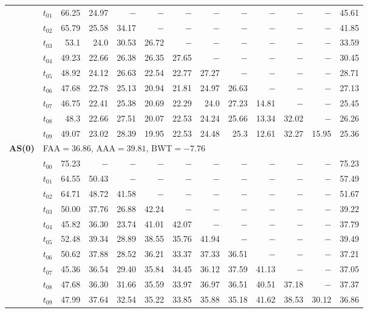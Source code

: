 \begin{table}[ht]
\begin{tabular}{@{}l l r r r r r r r r r r r@{}}
 & $t_{01}$ & 66.25 & 24.97 & $-$ & $-$ & $-$ & $-$ & $-$ & $-$ & $-$ & $-$ & 45.61 \\
 & $t_{02}$ & 65.79 & 25.58 & 34.17 & $-$ & $-$ & $-$ & $-$ & $-$ & $-$ & $-$ & 41.85 \\
 & $t_{03}$ & 53.1 & 24.0 & 30.53 & 26.72 & $-$ & $-$ & $-$ & $-$ & $-$ & $-$ & 33.59 \\
 & $t_{04}$ & 49.23 & 22.66 & 26.38 & 26.35 & 27.65 & $-$ & $-$ & $-$ & $-$ & $-$ & 30.45 \\
 & $t_{05}$ & 48.92 & 24.12 & 26.63 & 22.54 & 22.77 & 27.27 & $-$ & $-$ & $-$ & $-$ & 28.71 \\
 & $t_{06}$ & 47.68 & 22.78 & 25.13 & 20.94 & 21.81 & 24.97 & 26.63 & $-$ & $-$ & $-$ & 27.13 \\
 & $t_{07}$ & 46.75 & 22.41 & 25.38 & 20.69 & 22.29 & 24.0 & 27.23 & 14.81 & $-$ & $-$ & 25.45 \\
 & $t_{08}$ & 48.3 & 22.66 & 27.51 & 20.07 & 22.53 & 24.24 & 25.66 & 13.34 & 32.02 & $-$ & 26.26 \\
 & $t_{09}$ & 49.07 & 23.02 & 28.39 & 19.95 & 22.53 & 24.48 & 25.3 & 12.61 & 32.27 & 15.95 & 25.36 \\
\midrule
\multirow{11}{*}{\textbf{AS(0)}} & \multicolumn{12}{l}{\quad\small FAA$=36.86$,\; AAA$=39.81$,\; BWT$=-7.76$} \\
 & $t_{00}$ & 75.23 & $-$ & $-$ & $-$ & $-$ & $-$ & $-$ & $-$ & $-$ & $-$ & 75.23 \\
 & $t_{01}$ & 64.55 & 50.43 & $-$ & $-$ & $-$ & $-$ & $-$ & $-$ & $-$ & $-$ & 57.49 \\
 & $t_{02}$ & 64.71 & 48.72 & 41.58 & $-$ & $-$ & $-$ & $-$ & $-$ & $-$ & $-$ & 51.67 \\
 & $t_{03}$ & 50.00 & 37.76 & 26.88 & 42.24 & $-$ & $-$ & $-$ & $-$ & $-$ & $-$ & 39.22 \\
 & $t_{04}$ & 45.82 & 36.30 & 23.74 & 41.01 & 42.07 & $-$ & $-$ & $-$ & $-$ & $-$ & 37.79 \\
 & $t_{05}$ & 52.48 & 39.34 & 28.89 & 38.55 & 35.76 & 41.94 & $-$ & $-$ & $-$ & $-$ & 39.49 \\
 & $t_{06}$ & 50.62 & 37.88 & 28.52 & 36.21 & 33.37 & 37.33 & 36.51 & $-$ & $-$ & $-$ & 37.21 \\
 & $t_{07}$ & 45.36 & 36.54 & 29.40 & 35.84 & 34.45 & 36.12 & 37.59 & 41.13 & $-$ & $-$ & 37.05 \\
 & $t_{08}$ & 47.68 & 36.30 & 31.66 & 35.59 & 33.97 & 36.97 & 36.51 & 40.51 & 37.18 & $-$ & 37.37 \\
 & $t_{09}$ & 47.99 & 37.64 & 32.54 & 35.22 & 33.85 & 35.88 & 35.18 & 41.62 & 38.53 & 30.12 & 36.86 \\

\end{tabular}
\end{table}
